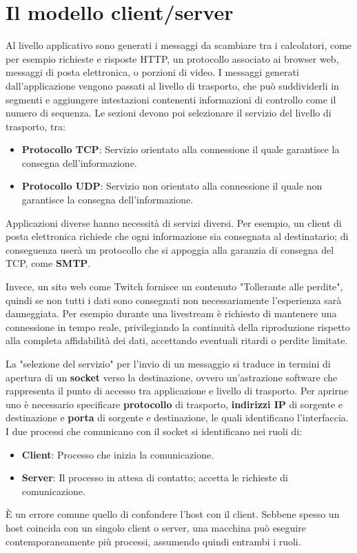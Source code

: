 \section{Il modello client/server}
Al livello applicativo sono generati i messaggi da scambiare tra i calcolatori, come per esempio richieste e risposte HTTP, un protocollo associato ai browser web, messaggi di posta elettronica, o porzioni di video. I messaggi generati dall'applicazione vengono passati al livello di trasporto, che può suddividerli in segmenti e aggiungere intestazioni contenenti informazioni di controllo come il numero di sequenza. Le sezioni devono poi selezionare il servizio del livello di trasporto, tra: \begin{itemize}
	\item \textbf{Protocollo TCP}: Servizio orientato alla connessione il quale garantisce la consegna dell'informazione.
	\item \textbf{Protocollo UDP}: Servizio non orientato alla connessione il quale non garantisce la consegna dell'informazione.
\end{itemize}
\noindent Applicazioni diverse hanno necessità di servizi diversi. Per esempio, un client di posta elettronica richiede che ogni informazione sia consegnata al destinatario; di conseguenza userà un protocollo che si appoggia alla garanzia di consegna del TCP, come \textbf{SMTP}.\par
Invece, un sito web come Twitch fornisce un contenuto "Tollerante alle perdite", quindi se non tutti i dati sono consegnati non necessariamente l'esperienza sarà danneggiata. Per esempio durante una livestream è richiesto di mantenere una connessione in tempo reale, privilegiando la continuità della riproduzione rispetto alla completa affidabilità dei dati, accettando eventuali ritardi o perdite limitate.\par
La "selezione del servizio" per l'invio di un messaggio si traduce in termini di apertura di un \textbf{socket} verso la destinazione, ovvero un'astrazione software che rappresenta il punto di accesso tra applicazione e livello di trasporto. Per aprirne uno è necessario specificare \textbf{protocollo} di trasporto, \textbf{indirizzi IP} di sorgente e destinazione e \textbf{porta} di sorgente e destinazione, le quali identificano l'interfaccia. I due processi che comunicano con il socket si identificano nei ruoli di: \begin{itemize}
	\item \textbf{Client}: Processo che inizia la comunicazione.
	\item \textbf{Server}: Il processo in attesa di contatto; accetta le richieste di comunicazione.
\end{itemize}
\noindent È un errore comune quello di confondere l'host con il client. Sebbene spesso un host coincida con un singolo client o server, una macchina può eseguire contemporaneamente più processi, assumendo quindi entrambi i ruoli.

